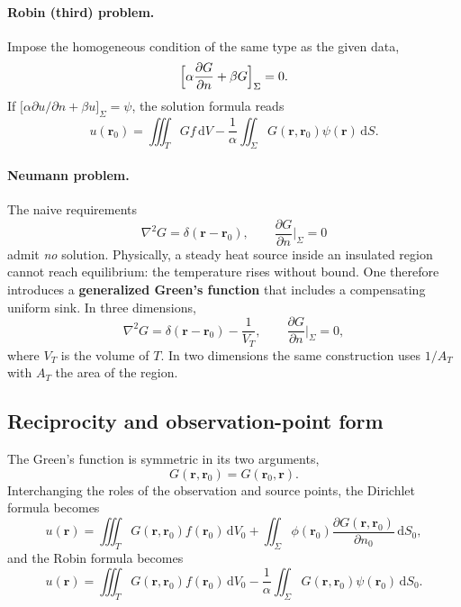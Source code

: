 \paragraph{Robin (third) problem.}
Impose the homogeneous condition of the same type as the given data,
\begin{equation}
\Bigl[\alpha\frac{\partial G}{\partial n}+\beta G\Bigr]_{\Sigma}=0.
\end{equation}
If $\bigl[\alpha\partial u/\partial n+\beta u\bigr]_{\Sigma}=\psi$, the solution formula reads
\begin{equation}
\label{eq:robin-G}
u(\mathbf{r}_0)
=\iiint_{T}Gf\,\mathrm{d}V
-\frac{1}{\alpha}\iint_{\Sigma}G(\mathbf{r},\mathbf{r}_0)\psi(\mathbf{r})\,\mathrm{d}S.
\end{equation}

\paragraph{Neumann problem.}
The naive requirements
\begin{equation}
\nabla^2 G=\delta(\mathbf{r}-\mathbf{r}_0),
\qquad
\frac{\partial G}{\partial n}\Big|_{\Sigma}=0
\end{equation}
admit \emph{no} solution. Physically, a steady heat source inside an insulated region cannot reach equilibrium: the temperature rises without bound. One therefore introduces a \textbf{generalized Green's function} that includes a compensating uniform sink. In three dimensions,
\begin{equation}
\nabla^2 G=\delta(\mathbf{r}-\mathbf{r}_0)-\frac{1}{V_T},
\qquad
\frac{\partial G}{\partial n}\Big|_{\Sigma}=0,
\end{equation}
where $V_T$ is the volume of $T$. In two dimensions the same construction uses $1/A_T$ with $A_T$ the area of the region.

\subsection{Reciprocity and observation-point form}

The Green's function is symmetric in its two arguments,
\begin{equation}
G(\mathbf{r},\mathbf{r}_0)=G(\mathbf{r}_0,\mathbf{r}).
\end{equation}
Interchanging the roles of the observation and source points, the Dirichlet formula becomes
\begin{equation}
\label{eq:dirichlet-obs}
u(\mathbf{r})
=\iiint_{T}G(\mathbf{r},\mathbf{r}_0)f(\mathbf{r}_0)\,\mathrm{d}V_0
+\iint_{\Sigma}\phi(\mathbf{r}_0)\frac{\partial G(\mathbf{r},\mathbf{r}_0)}{\partial n_0}\,\mathrm{d}S_0,
\end{equation}
and the Robin formula becomes
\begin{equation}
u(\mathbf{r})
=\iiint_{T}G(\mathbf{r},\mathbf{r}_0)f(\mathbf{r}_0)\,\mathrm{d}V_0
-\frac{1}{\alpha}\iint_{\Sigma}G(\mathbf{r},\mathbf{r}_0)\psi(\mathbf{r}_0)\,\mathrm{d}S_0.
\end{equation}

